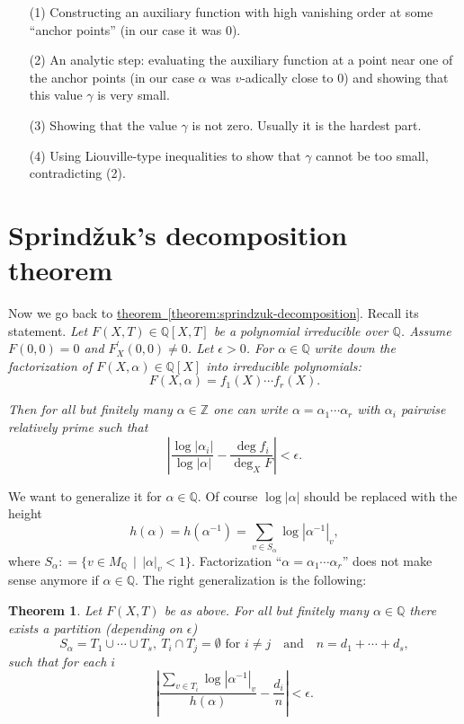 \documentclass{article}
\newcommand{\dfn}{\mathrel{\mathop:}=}
\newcommand{\ZZ}{\mathbb{Z}}
\newcommand{\QQ}{\mathbb{Q}}
\newcommand{\refref}[2]{\hyperref[#2]{#1~\ref*{#2}}}
\theoremstyle{myplain}
\newtheorem{theorem}[proposition]{Theorem}
\theoremstyle{mydefinition}
\begin{document}
\begin{enumerate}
\item[(1)] Constructing an auxiliary function with high vanishing order at some
  ``anchor points'' (in our case it was $0$).

\item[(2)] An analytic step: evaluating the auxiliary function at a point near
  one of the anchor points (in our case $\alpha$ was $v$-adically close to $0$)
  and showing that this value $\gamma$ is very small.

\item[(3)] Showing that the value $\gamma$ is not zero. Usually it is the
  hardest part.

\item[(4)] Using Liouville-type inequalities to show that $\gamma$ cannot be too
  small, contradicting (2).
\end{enumerate}

\section{Sprind\v{z}uk's decomposition theorem}
\label{section:Sprindzuk-decomposition}

Now we go back to \refref{theorem}{theorem:sprindzuk-decomposition}. Recall its
statement. \emph{Let $F (X,T) \in \QQ [X,T]$ be a polynomial irreducible over
  $\QQ$. Assume $F (0,0) = 0$ and $F^\prime_X (0,0) \ne 0$. Let $\epsilon >
  0$. For $\alpha \in \QQ$ write down the factorization of
  $F (X,\alpha) \in \QQ [X]$ into irreducible polynomials:}
\[ F (X,\alpha) = f_1 (X) \cdots f_r (X). \]

\emph{Then for all but finitely many $\alpha \in \ZZ$ one can write
  $\alpha = \alpha_1 \cdots \alpha_r$ with $\alpha_i$ pairwise relatively prime
  such that}
\[ \left| \frac{\log |\alpha_i|}{\log |\alpha|} - \frac{\deg f_i}{\deg_X F} \right| < \epsilon. \]

\vspace{1em}

We want to generalize it for $\alpha \in \QQ$. Of course $\log |\alpha|$ should
be replaced with the height
$$h (\alpha) = h (\alpha^{-1}) = \sum_{v\in S_\alpha} \log |\alpha^{-1}|_v,$$
where $S_\alpha \dfn \{ v\in M_\QQ \,\mid\, |\alpha|_v < 1 \}$. Factorization
``$\alpha = \alpha_1 \cdots \alpha_r$'' does not make sense anymore if
$\alpha \in \QQ$. The right generalization is the following:

\begin{theorem}
  Let $F (X,T)$ be as above. For all but finitely many $\alpha \in \QQ$ there
  exists a partition (depending on $\epsilon$)
  \[ S_\alpha = T_1 \cup \cdots \cup T_s, ~
    T_i\cap T_j = \emptyset \text{ for } i\ne j
    \quad \text{and} \quad
    n = d_1 + \cdots + d_s, \]
  such that for each $i$
  $$\left| \frac{\sum_{v\in T_i} \log |\alpha^{-1}|_v}{h (\alpha)} - \frac{d_i}{n} \right| < \epsilon.$$
\end{theorem}
\end{document}

